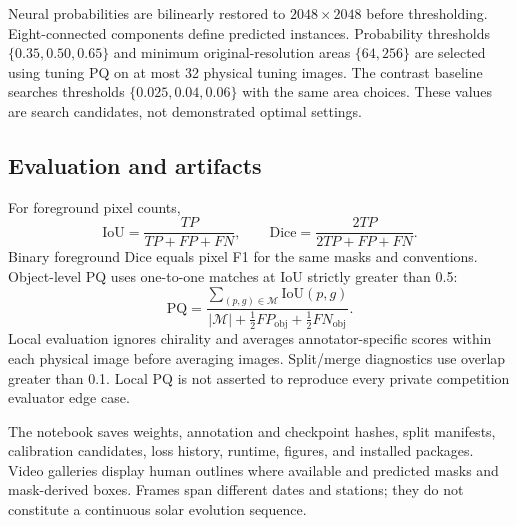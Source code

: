 \documentclass[conference]{IEEEtran}
\begin{document}
Neural probabilities are bilinearly restored to $2048\times2048$ before
thresholding. Eight-connected components define predicted instances.
Probability thresholds $\{0.35,0.50,0.65\}$ and minimum original-resolution
areas $\{64,256\}$ are selected using tuning PQ on at most 32 physical tuning
images. The contrast baseline searches thresholds $\{0.025,0.04,0.06\}$ with
the same area choices. These values are search candidates, not demonstrated
optimal settings.

\subsection{Evaluation and artifacts}
For foreground pixel counts,
\begin{equation}
\mathrm{IoU}=\frac{TP}{TP+FP+FN},\qquad
\mathrm{Dice}=\frac{2TP}{2TP+FP+FN}.
\end{equation}
Binary foreground Dice equals pixel F1 for the same masks and conventions.
Object-level PQ \cite{pq} uses one-to-one matches at IoU strictly greater
than 0.5:
\begin{equation}
\mathrm{PQ}=
\frac{\sum_{(p,g)\in\mathcal{M}}\mathrm{IoU}(p,g)}
{|\mathcal{M}|+\tfrac12 FP_{\mathrm{obj}}+\tfrac12 FN_{\mathrm{obj}}}.
\end{equation}
Local evaluation ignores chirality and averages annotator-specific scores
within each physical image before averaging images. Split/merge diagnostics
use overlap greater than 0.1. Local PQ is not asserted to reproduce every
private competition evaluator edge case.

The notebook saves weights, annotation and checkpoint hashes, split manifests,
calibration candidates, loss history, runtime, figures, and installed packages.
Video galleries display human outlines where available and predicted masks
and mask-derived boxes. Frames span different dates and stations; they do not
constitute a continuous solar evolution sequence.
\end{document}
